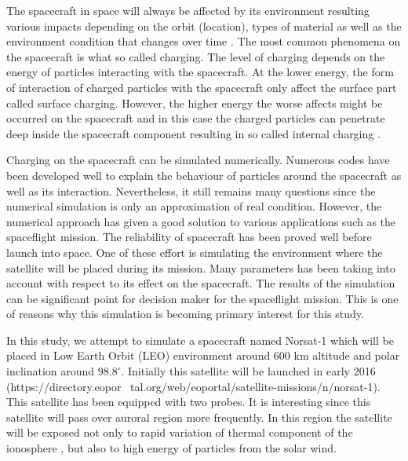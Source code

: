 

The spacecraft in space will always be affected by its environment resulting various
impacts depending on the orbit (location), types of material as well as the environment
condition that changes over time \citep{trove.nla.gov.au/work/21680840}. The  most common phenomena on the spacecraft is what so
called charging. The level of charging depends on the energy of particles interacting with
the spacecraft. At the lower energy, the form of interaction of charged particles with the
spacecraft only affect the surface part called surface charging. However, the higher energy
the worse affects might be occurred on the spacecraft and in this case the charged particles
can penetrate deep inside the spacecraft component resulting in so called internal charging \citep{fennell2001spacecraft}.

Charging on the spacecraft can be simulated numerically. Numerous codes have been developed
well to explain the behaviour of particles around the spacecraft as well as its interaction.
Nevertheless, it still remains many questions since the numerical simulation is only an approximation
of real condition. However, the numerical approach has given a good solution to various applications
such as the spaceflight mission. The reliability of spacecraft has been proved well before launch into space.
One of these effort is simulating the environment where the satellite will be placed during its mission.
Many parameters has been taking into account with respect to its effect on the spacecraft.
The results of the simulation can be significant point for decision maker for the spaceflight
 mission. This is one of reasons why this simulation is becoming primary interest for this study.

In this study, we attempt to simulate a spacecraft named Norsat-1 which will be placed in
Low Earth Orbit (LEO) environment around 600 km altitude and polar inclination around \(98.8^\circ\).
Initially this satellite will be launched in early 2016
(https://directory.eopor~ tal.org/web/eoportal/satellite-missions/n/norsat-1). This satellite
has been equipped with two probes. It is interesting since this satellite will pass over
auroral region more frequently. In this region  the satellite will be exposed not only to
rapid variation of thermal component of the ionosphere \citep{hastings1995review}, but also to high
energy of particles from the solar wind.

